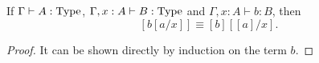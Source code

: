 \begin{prop}
  If $\Gamma \vdash A:\operatorname{Type}$, $\Gamma,x:A \vdash B:\operatorname{Type}$ and $\Gamma,x:A \vdash b:B$, then 
  \[ [b[a/x]] \equiv [b][[a]/x]. \]
\end{prop}
\begin{proof}
It can be shown directly by induction on the term $b$.



\end{proof}

